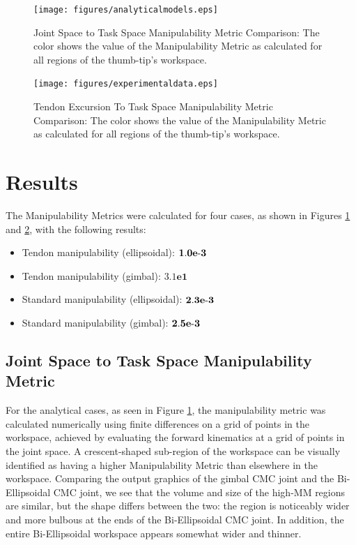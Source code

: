 \documentclass[journal]{IEEEtran}
\begin{document}
\begin{figure}
	\centering
	\texttt{[image: figures/analyticalmodels.eps]}
	\caption{Joint Space to Task Space Manipulability Metric Comparison: The color shows the value of the Manipulability Metric as calculated for all regions of the thumb-tip's workspace.}\label{analyticplot}
\end{figure}

\begin{figure}
	\centering
	\texttt{[image: figures/experimentaldata.eps]}
	\caption{Tendon Excursion To Task Space Manipulability Metric Comparison: The color shows the value of the Manipulability Metric as calculated for all regions of the thumb-tip's workspace.}\label{experimentplot}
\end{figure}


\section{Results}
\label{results}

The Manipulability Metrics were calculated for four cases, as shown in Figures \ref{analyticplot} and \ref{experimentplot}, with the following results: 

\begin{itemize}
 \item Tendon manipulability (ellipsoidal):   \hfill         $\mathbf{1.0e{\text -}3}$
 \item Tendon manipulability (gimbal):        \hfill
 $\mathbf{3.1e1}$
 \item Standard manipulability (ellipsoidal): \hfill         $\mathbf{2.3e{\text -}3}$
 \item Standard manipulability (gimbal):      \hfill         $\mathbf{2.5e{\text -}3}$
\end{itemize}


\subsection{Joint Space to Task Space Manipulability Metric}

For the analytical cases, as seen in Figure \ref{analyticplot}, the manipulability metric was calculated numerically using finite differences on a grid of points in the workspace, achieved by evaluating the forward kinematics at a grid of points in the joint space. A crescent-shaped sub-region of the workspace can be visually identified as having a higher Manipulability Metric than elsewhere in the workspace. Comparing the output graphics of the gimbal CMC joint and the Bi-Ellipsoidal CMC joint, we see that the volume and size of the high-MM regions are similar, but the shape differs between the two: the region is noticeably wider and more bulbous at the ends of the Bi-Ellipsoidal CMC joint. In addition, the entire Bi-Ellipsoidal workspace appears somewhat wider and thinner.
\end{document}
